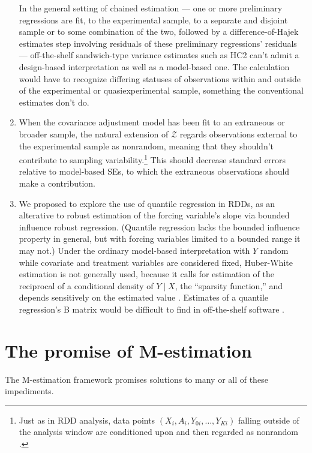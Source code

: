 \begin{enumerate}
  In the general setting of chained estimation ---  one or more
  preliminary regressions are fit, to the experimental sample, to a
  separate and disjoint sample or to some combination of the two,
  followed by a difference-of-Hajek estimates step involving residuals
  of these preliminary regressions' residuals --- off-the-shelf
  sandwich-type variance estimates such as HC2 can't admit a design-based interpretation as well as
  a  model-based one. The calculation would have to recognize differing statuses of observations within and outside of the experimental or quasiexperimental sample, something the conventional estimates don't do.
\item \label{it:prob-nonexperimentals-as-nonrandom}
  When the covariance adjustment model has been fit to an extraneous or
  broader sample, the natural extension of \(\mathcal{Z}\) regards
  observations external to the experimental sample as nonrandom, meaning
  that they shouldn't contribute to sampling variability.\footnote{Just as in
  RDD analysis, data points $(X_{i}, A_{i}, Y_{0i}, \ldots, Y_{Ki})$
  falling outside of the analysis window are
  conditioned upon and then regarded as nonrandom \citep[][display A1 on p.22]{salesHansen2019lrd}.} This should decrease standard
  errors relative to model-based SEs, to which the extraneous observations should make a
  contribution.
\item \label{it:quantile-regr-SEs}  We proposed to explore the use of
  quantile regression in RDDs, as an alterative to robust estimation
  of the forcing variable's slope via bounded influence robust
  regression. (Quantile regression lacks the bounded influence
  property in general, but with forcing variables limited to a bounded
  range it may not.) Under the ordinary model-based interpretation
  with $Y$ random while covariate and treatment variables are
  considered fixed, Huber-White estimation is not generally used,
  because it calls for estimation of the reciprocal of a conditional density of $Y
  \mid X$, the ``sparsity function,'' and depends sensitively on the estimated
  value \citep[][\S3.4]{koenker2005quantileregr}. Estimates of a quantile regression's B matrix would be
  difficult to find in off-the-shelf software \citep[][\S2.5]{he18resampling}.
\end{enumerate}

\section*{The promise of M-estimation}
The M-estimation framework promises solutions to many or all of
these impediments.
